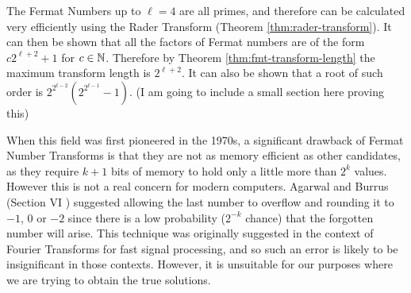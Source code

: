 The Fermat Numbers up to $\ell = 4$ are all primes, and therefore can be calculated very efficiently using the Rader Transform (Theorem \ref{thm:rader-transform}). It can then be shown \cite{intro-to-fmt} that all the factors of Fermat numbers are of the form $c2^{\ell + 2} + 1$ for $c \in {\mathbb N}$. Therefore by Theorem \ref{thm:fmt-transform-length} the maximum transform length is $2^{\ell + 2}$. It can also be shown that a root of such order is $2^{2^{t-2}}(2^{2^{t-1}} - 1)$.
(I am going to include a small section here proving this)

\medskip

When this field was first pioneered in the 1970s, a significant drawback of Fermat Number Transforms is that they are not as memory efficient as other candidates, as they require $k + 1$ bits of memory to hold only a little more than $2^k$ values. However this is not a real concern for modern computers. Agarwal and Burrus (Section VI \cite{intro-to-fmt}) suggested allowing the last number to overflow and rounding it to $\minus 1$, $0$ or $-2$ since there is a low probability ($2^{-k}$ chance) that the forgotten number will arise. This technique was originally suggested in the context of Fourier Transforms for fast signal processing, and so such an error is likely to be insignificant in those contexts. However, it is unsuitable for our purposes where we are trying to obtain the true solutions.

